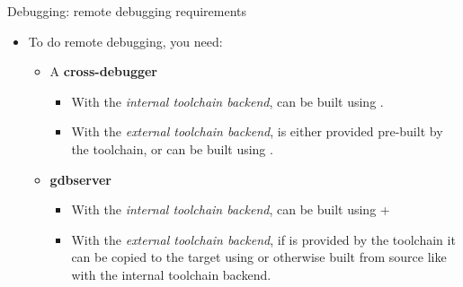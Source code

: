 \begin{frame}{Debugging: remote debugging requirements}
  \begin{itemize}
  \item To do remote debugging, you need:
    \begin{itemize}
    \item A {\bf cross-debugger}
      \begin{itemize}
      \item With the {\em internal toolchain backend}, can be built
        using .
      \item With the {\em external toolchain backend}, is either
        provided pre-built by the toolchain, or can be built using
        .
      \end{itemize}
    \item {\bf gdbserver}
      \begin{itemize}
      \item With the {\em internal toolchain backend}, can be built
        using  + 
      \item With the {\em external toolchain backend}, if
         is provided by the toolchain it can be copied
        to the target using
         or otherwise
        built from source like with the internal toolchain backend.
      \end{itemize}
    \end{itemize}
  \end{itemize}
\end{frame}

